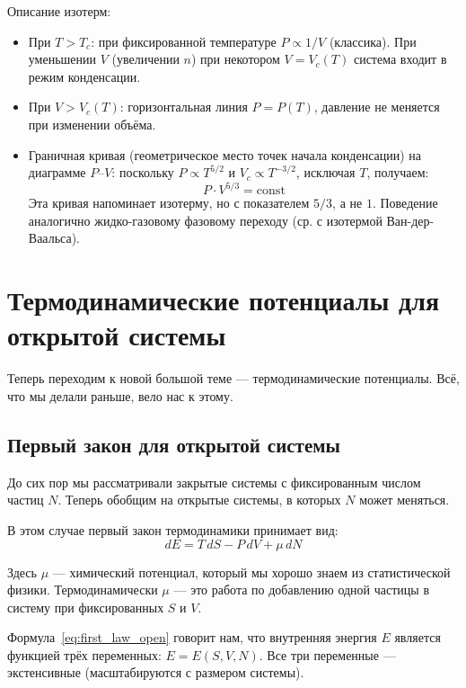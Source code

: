\documentclass[../general/general]{subfiles}
\begin{document}
Описание изотерм:
\begin{itemize}
    \item При $T > T_c$: при фиксированной температуре $P \propto 1/V$ (классика). При уменьшении $V$ (увеличении $n$) при некотором $V = V_c(T)$ система входит в режим конденсации.
    \item При $V > V_c(T)$: горизонтальная линия $P = P(T)$, давление не меняется при изменении объёма.
    \item Граничная кривая (геометрическое место точек начала конденсации) на диаграмме $P$--$V$: поскольку $P \propto T^{5/2}$ и $V_c \propto T^{-3/2}$, исключая $T$, получаем:
    \begin{equation}
        P\cdot V^{5/3} = \text{const}
    \end{equation}
    Эта кривая напоминает изотерму, но с показателем $5/3$, а не $1$. Поведение аналогично жидко-газовому фазовому переходу (ср. с изотермой Ван-дер-Ваальса).
\end{itemize}



\section{Термодинамические потенциалы для открытой системы}

Теперь переходим к новой большой теме --- термодинамические потенциалы. Всё, что мы делали раньше, вело нас к этому.

\subsection{Первый закон для открытой системы}

До сих пор мы рассматривали закрытые системы с фиксированным числом частиц $N$. Теперь обобщим на открытые системы, в которых $N$ может меняться.

В этом случае первый закон термодинамики принимает вид:
\begin{equation}
    \boxed{dE = T\,dS - P\,dV + \mu\,dN}
    \label{eq:first_law_open}
\end{equation}

Здесь $\mu$ --- химический потенциал, который мы хорошо знаем из статистической физики. Термодинамически $\mu$ --- это работа по добавлению одной частицы в систему при фиксированных $S$ и $V$.

Формула~\eqref{eq:first_law_open} говорит нам, что внутренняя энергия $E$ является функцией трёх переменных: $E = E(S, V, N)$. Все три переменные --- экстенсивные (масштабируются с размером системы).
\end{document}
